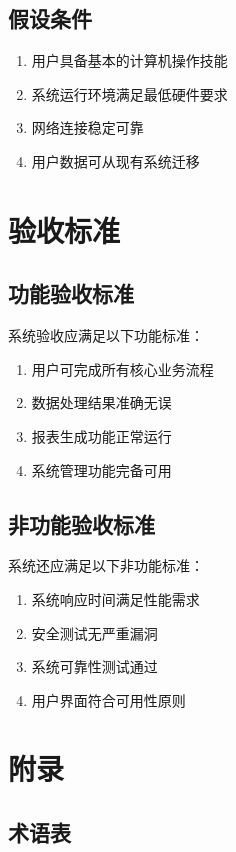 \documentclass[a4paper,12pt]{article}
\begin{document}
\subsection{假设条件}

\begin{enumerate}
  \item 用户具备基本的计算机操作技能
  \item 系统运行环境满足最低硬件要求
  \item 网络连接稳定可靠
  \item 用户数据可从现有系统迁移
\end{enumerate}

\section{验收标准}

\subsection{功能验收标准}

系统验收应满足以下功能标准：

\begin{enumerate}
  \item 用户可完成所有核心业务流程
  \item 数据处理结果准确无误
  \item 报表生成功能正常运行
  \item 系统管理功能完备可用
\end{enumerate}

\subsection{非功能验收标准}

系统还应满足以下非功能标准：

\begin{enumerate}
  \item 系统响应时间满足性能需求
  \item 安全测试无严重漏洞
  \item 系统可靠性测试通过
  \item 用户界面符合可用性原则
\end{enumerate}

\section{附录}

\subsection{术语表}
\end{document}
